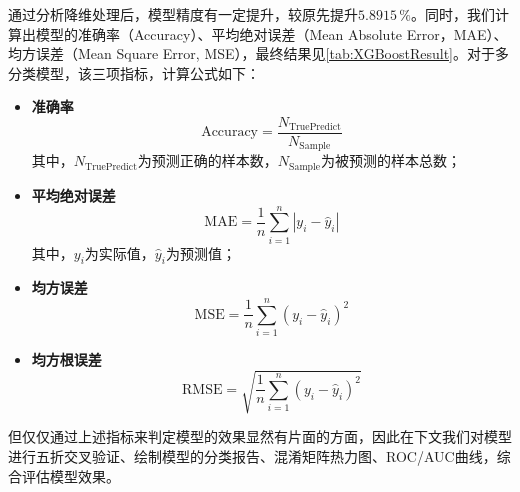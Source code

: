 \documentclass{MathorCupModeling}
\begin{document}
	通过分析降维处理后，模型精度有一定提升，较原先提升$5.8915\,\%$。同时，我们计算出模型的准确率（Accuracy）、平均绝对误差（Mean Absolute Error，MAE）、均方误差（Mean Square Error, MSE），最终结果见\textcolor{blue}{\cref{tab:XGBoostResult}}。对于多分类模型，该三项指标，计算公式如下：
\begin{itemize}
	\item \textbf{准确率}
		\begin{equation}
		\mathrm{Accuracy}=\frac{N_{\mathrm{TruePredict}}}{N_{\mathrm{Sample}}} \label{Accuracy}
		\end{equation}
	其中，$N_{\mathrm{TruePredict}}$为预测正确的样本数，$N_{\mathrm{Sample}}$为被预测的样本总数；
	\item \textbf{平均绝对误差}
		\begin{equation}
		\mathrm{MAE}=\frac{1}{n}\sum_{i=1}^{n}\left|y_{i}-\hat{y}_{i}\right| \label{MAE}
		\end{equation}
	其中，$y_i$为实际值，$\hat{y}_i$为预测值；
	\item \textbf{均方误差}
		\begin{equation}
		\mathrm{MSE}=\frac{1}{n}\sum_{i=1}^{n}\left(y_{i}-\hat{y}_{i}\right)^{2} \label{MSE}
		\end{equation}
	\item \textbf{均方根误差}
		\begin{equation}
		\mathrm{RMSE}=\sqrt{\frac{1}{n}\sum_{i=1}^{n}\left(y_{i}-\hat{y}_{i}\right)^{2}} \label{RMSE}
		\end{equation}
\end{itemize}

\begin{table}[H]
	\centering
	\caption{XGBoost模型最终效果}
	\label{tab:XGBoostResult}
\end{table}

但仅仅通过上述指标来判定模型的效果显然有片面的方面，因此在下文我们对模型进行五折交叉验证、绘制模型的分类报告、混淆矩阵热力图、ROC/AUC曲线，综合评估模型效果。
\end{document}
